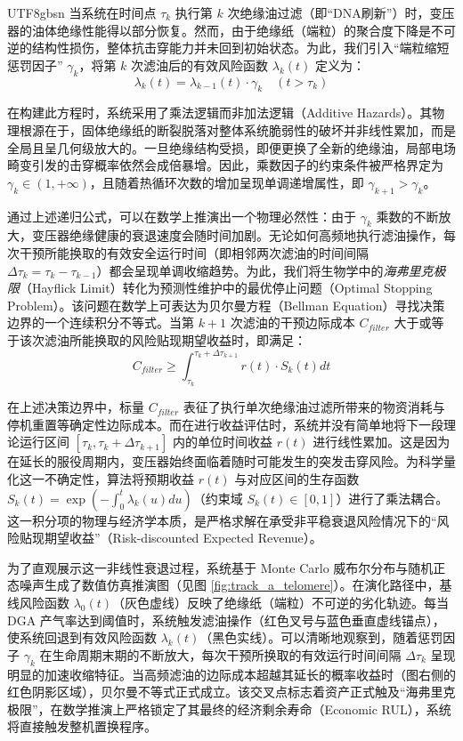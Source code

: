 \documentclass[journal]{IEEEtran}
\begin{document}
\begin{CJK*}{UTF8}{gbsn}
当系统在时间点 $\tau_k$ 执行第 $k$ 次绝缘油过滤（即“DNA刷新”）时，变压器的油体绝缘性能得以部分恢复。然而，由于绝缘纸（端粒）的聚合度下降是不可逆的结构性损伤，整体抗击穿能力并未回到初始状态。为此，我们引入“端粒缩短惩罚因子” $\gamma_k$，将第 $k$ 次滤油后的有效风险函数 $\lambda_k(t)$ 定义为：
\begin{equation}
\lambda_k(t) = \lambda_{k-1}(t) \cdot \gamma_k \quad (t > \tau_k)
\end{equation}

在构建此方程时，系统采用了乘法逻辑而非加法逻辑（Additive Hazards）。其物理根源在于，固体绝缘纸的断裂脱落对整体系统脆弱性的破坏并非线性累加，而是全局且呈几何级放大的。一旦绝缘结构受损，即便更换了全新的绝缘油，局部电场畸变引发的击穿概率依然会成倍暴增。因此，乘数因子的约束条件被严格界定为 $\gamma_k \in (1, +\infty)$，且随着热循环次数的增加呈现单调递增属性，即 $\gamma_{k+1} > \gamma_k$。

通过上述递归公式，可以在数学上推演出一个物理必然性：由于 $\gamma_k$ 乘数的不断放大，变压器绝缘健康的衰退速度会随时间加剧。无论如何高频地执行滤油操作，每次干预所能换取的有效安全运行时间（即相邻两次滤油的时间间隔 $\Delta \tau_k = \tau_k - \tau_{k-1}$）都会呈现单调收缩趋势。为此，我们将生物学中的\textit{海弗里克极限}（Hayflick Limit）转化为预测性维护中的最优停止问题（Optimal Stopping Problem）\cite{TODO_CITE_OPTIMAL_STOPPING}。该问题在数学上可表达为贝尔曼方程（Bellman Equation）寻找决策边界的一个连续积分不等式。当第 $k+1$ 次滤油的干预边际成本 $C_{filter}$ 大于或等于该次滤油所能换取的风险贴现期望收益时，即满足：
\begin{equation}
C_{filter} \geq \int_{\tau_k}^{\tau_k + \Delta \tau_{k+1}} r(t) \cdot S_k(t) dt
\end{equation}

在上述决策边界中，标量 $C_{filter}$ 表征了执行单次绝缘油过滤所带来的物资消耗与停机重置等确定性边际成本。而在进行收益评估时，系统并没有简单地将下一段理论运行区间 $[\tau_k, \tau_k + \Delta \tau_{k+1}]$ 内的单位时间收益 $r(t)$ 进行线性累加。这是因为在延长的服役周期内，变压器始终面临着随时可能发生的突发击穿风险。为科学量化这一不确定性，算法将预期收益 $r(t)$ 与对应区间的生存函数 $S_k(t) = \exp\left(-\int_0^t \lambda_k(u)du\right)$（约束域 $S_k(t) \in [0,1]$）进行了乘法耦合。这一积分项的物理与经济学本质，是严格求解在承受非平稳衰退风险情况下的“风险贴现期望收益”（Risk-discounted Expected Revenue）。

为了直观展示这一非线性衰退过程，系统基于 Monte Carlo 威布尔分布与随机正态噪声生成了数值仿真推演图（见图 \ref{fig:track_a_telomere}）。在演化路径中，基线风险函数 $\lambda_0(t)$（灰色虚线）反映了绝缘纸（端粒）不可逆的劣化轨迹。每当 DGA 产气率达到阈值时，系统触发滤油操作（红色叉号与蓝色垂直虚线锚点），使系统回退到有效风险函数 $\lambda_k(t)$（黑色实线）。可以清晰地观察到，随着惩罚因子 $\gamma_k$ 在生命周期末期的不断放大，每次干预所换取的有效运行时间间隔 $\Delta \tau_k$ 呈现明显的加速收缩特征。当高频滤油的边际成本超越其延长的概率收益时（图右侧的红色阴影区域），贝尔曼不等式正式成立。该交叉点标志着资产正式触及“海弗里克极限”，在数学推演上严格锁定了其最终的经济剩余寿命（Economic RUL），系统将直接触发整机置换程序。


\end{CJK*}
\end{document}
